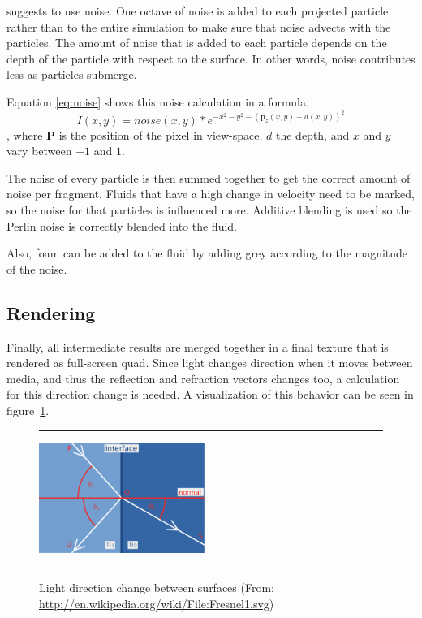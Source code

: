 \cite{van2009screen} suggests to use \cite{perlin1985image} noise.
One octave of noise is added to each projected particle, rather than to the entire simulation to make sure that noise advects with the particles.
The amount of noise that is added to each particle depends on the depth of the particle with respect to the surface.
In other words, noise contributes less as particles submerge.

Equation \ref{eq:noise} shows this noise calculation in a formula.
\begin{equation}
\label{eq:noise}
	I(x,y) = noise(x,y) \ast e^{-x^2 - y^2 - (\mathbf{p}_z(x,y)-d(x,y))^2}
\end{equation}
, where $\mathbf{P}$ is the position of the pixel in view-space, $d$ the depth, and $x$ and $y$ vary between $-1$ and $1$.

The noise of every particle is then summed together to get the correct amount of noise per fragment.
Fluids that have a high change in velocity need to be marked, so the noise for that particles is influenced more.
Additive blending is used so the Perlin noise is correctly blended into the fluid.

Also, foam can be added to the fluid by adding grey according to the magnitude of the noise.

\subsection{Rendering}
Finally, all intermediate results are merged together in a final texture that is rendered as full-screen quad.
Since light changes direction when it moves between media, and thus the reflection and refraction vectors changes too, a calculation for this direction change is needed.
A visualization of this behavior can be seen in figure~\ref{fig:fresnel}.
\begin{figure}[!th]
\hrule
\begin{center}
\vspace*{2ex}\includegraphics[width=0.48\textwidth]{pictures/Fresnel.eps}
\end{center}
\caption{Light direction change between surfaces (From: \url{http://en.wikipedia.org/wiki/File:Fresnel1.svg})}
\label{fig:fresnel} 
\vspace*{2ex}
\hrule
\end{figure}


